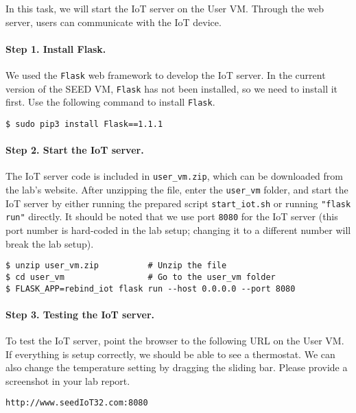 In this task, we will start the IoT server on the User VM. 
Through the web server, users can communicate with the 
IoT device.


\paragraph{Step 1. Install Flask.}
We used the \texttt{Flask} web framework to develop the
IoT server. In the current version of the SEED VM, \texttt{Flask} 
has not been installed, so we need to install it first.
Use the following command to install \texttt{Flask}.

\begin{lstlisting}
$ sudo pip3 install Flask==1.1.1
\end{lstlisting}


\paragraph{Step 2. Start the IoT server.}
The IoT server code is included in \texttt{user\_vm.zip}, which 
can be downloaded from the lab's website. After unzipping the file,
enter the \texttt{user\_vm} folder, and start the IoT server 
by either running the prepared script \texttt{start\_iot.sh} 
or running \texttt{"flask run"} directly. It should be noted 
that we use port \texttt{8080} for the IoT server (this port number is 
hard-coded in the lab setup; changing it to a different number
will break the lab setup).


\begin{lstlisting}
$ unzip user_vm.zip          # Unzip the file
$ cd user_vm                 # Go to the user_vm folder
$ FLASK_APP=rebind_iot flask run --host 0.0.0.0 --port 8080
\end{lstlisting}
 

\paragraph{Step 3. Testing the IoT server.}
To test the IoT server, point the browser to the following URL on the 
User VM. If everything is setup correctly, we should be able to see 
a thermostat. We can also change the temperature setting by dragging the 
sliding bar. Please provide a screenshot in your lab report. 

\begin{lstlisting}
http://www.seedIoT32.com:8080
\end{lstlisting}



